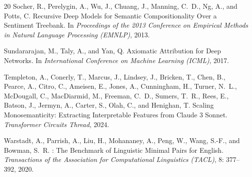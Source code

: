 \documentclass{article}
\begin{document}
\begin{thebibliography}{20}
Socher, R., Perelygin, A., Wu, J., Chuang, J., Manning, C.~D., Ng, A., and Potts, C.
\newblock Recursive Deep Models for Semantic Compositionality Over a Sentiment Treebank.
\newblock In \emph{Proceedings of the 2013 Conference on Empirical Methods in Natural Language Processing (EMNLP)}, 2013.

Sundararajan, M., Taly, A., and Yan, Q.
\newblock Axiomatic Attribution for Deep Networks.
\newblock In \emph{International Conference on Machine Learning (ICML)}, 2017.

Templeton, A., Conerly, T., Marcus, J., Lindsey, J., Bricken, T., Chen, B., Pearce, A., Citro, C., Ameisen, E., Jones, A., Cunningham, H., Turner, N.~L., McDougall, C., MacDiarmid, M., Freeman, C.~D., Sumers, T.~R., Rees, E., Batson, J., Jermyn, A., Carter, S., Olah, C., and Henighan, T.
\newblock Scaling Monosemanticity: Extracting Interpretable Features from {Claude} 3 {Sonnet}.
\newblock \emph{Transformer Circuits Thread}, 2024.

Warstadt, A., Parrish, A., Liu, H., Mohananey, A., Peng, W., Wang, S.-F., and Bowman, S.~R.
: The Benchmark of Linguistic Minimal Pairs for {English}.
\newblock \emph{Transactions of the Association for Computational Linguistics (TACL)}, 8: 377--392, 2020.

\end{thebibliography}
\end{document}
